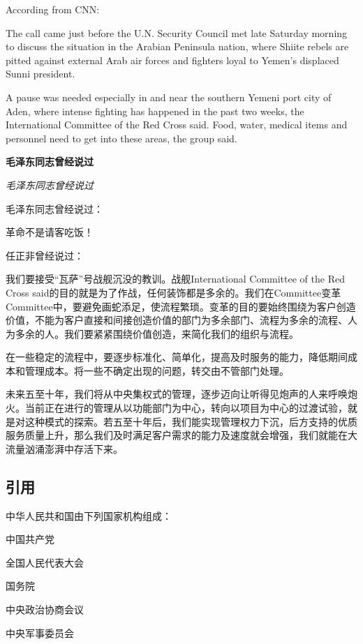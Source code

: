 According from CNN:

\begin{QuoteEnglish}
The call came just before the U.N. Security Council met late Saturday morning to discuss the situation in the Arabian Peninsula nation, where Shiite rebels are pitted against external Arab air forces and fighters loyal to Yemen's displaced Sunni president.

A pause was needed especially in and near the southern Yemeni port city of Aden, where intense fighting has happened in the past two weeks, the International Committee of the Red Cross said. Food, water, medical items and personnel need to get into these areas, the group said.
\end{QuoteEnglish}

{\bfseries 毛泽东同志曾经说过}

{\itshape 毛泽东同志曾经说过}

毛泽东同志曾经说过：

\begin{QuoteChinese}
革命不是请客吃饭！
\end{QuoteChinese}

任正非曾经说过：

\begin{QuoteChinese}
我们要接受“瓦萨”号战舰沉没的教训。战舰International Committee of the Red Cross said的目的就是为了作战，任何装饰都是多余的。我们在Committee变革Committee中，要避免画蛇添足，使流程繁琐。变革的目的要始终围绕为客户创造价值，不能为客户直接和间接创造价值的部门为多余部门、流程为多余的流程、人为多余的人。我们要紧紧围绕价值创造，来简化我们的组织与流程。

在一些稳定的流程中，要逐步标准化、简单化，提高及时服务的能力，降低期间成本和管理成本。将一些不确定出现的问题，转交由不管部门处理。

未来五至十年，我们将从中央集权式的管理，逐步迈向让听得见炮声的人来呼唤炮火。当前正在进行的管理从以功能部门为中心，转向以项目为中心的过渡试验，就是对这种模式的探索。若五至十年后，我们能实现管理权力下沉，后方支持的优质服务质量上升，那么我们及时满足客户需求的能力及速度就会增强，我们就能在大流量汹涌澎湃中存活下来。
\end{QuoteChinese}

\subsection{引用}

中华人民共和国由下列国家机构组成：

\begin{Enumerate}
\item {中国共产党}
\item {全国人民代表大会}
\item {国务院}
\item {中央政治协商会议}
\item {中央军事委员会}
\end{Enumerate}

